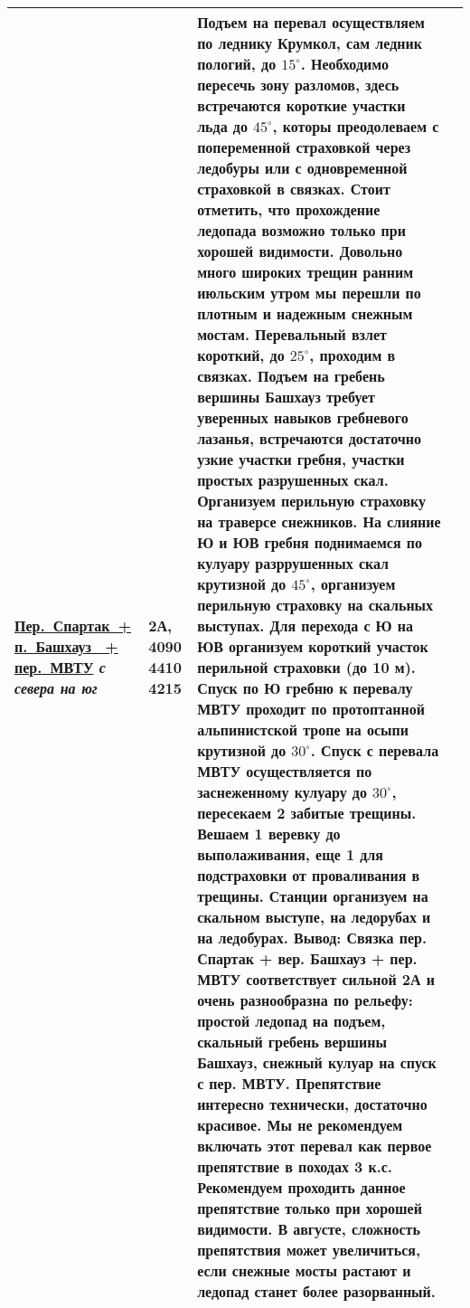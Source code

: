 {\begin{longtable}{|>{\centering\arraybackslash}m{3.8cm}|>{\centering\arraybackslash}m{1.3cm}|>{\raggedright\arraybackslash}m{11.5cm}|>{\centering\arraybackslash}m{1cm}|}
			\hyperref[subsec:Day6]{Пер.~Спартак~+ п.~Башхауз~ + пер.~МВТУ}										\newline\textit{с севера на юг}			&	2А, 4090 4410 4215			&	Подъем на перевал осуществляем по леднику Крумкол, сам ледник пологий, до $15^\circ$. Необходимо пересечь зону разломов, здесь встречаются короткие участки льда до $45^\circ$, которы преодолеваем с попеременной страховкой через ледобуры или с одновременной страховкой в связках. Стоит отметить, что прохождение ледопада возможно только при хорошей видимости. Довольно много широких трещин ранним июльским утром мы перешли по плотным и надежным снежным мостам. Перевальный взлет короткий, до $25^\circ$, проходим в связках. Подъем на гребень вершины Башхауз требует уверенных навыков гребневого лазанья, встречаются достаточно узкие участки гребня, участки простых разрушенных скал. Организуем перильную страховку на траверсе снежников. На слияние Ю и ЮВ гребня поднимаемся по кулуару разррушенных скал крутизной до $45^\circ$, организуем перильную страховку на скальных выступах. Для перехода с Ю на ЮВ организуем короткий участок перильной страховки (до 10 м). Спуск по Ю гребню к перевалу МВТУ проходит по протоптанной альпинистской тропе на осыпи крутизной до $30^\circ$. Спуск с перевала МВТУ осуществляется по заснеженному кулуару до $30^\circ$, пересекаем 2 забитые трещины. Вешаем 1 веревку до выполаживания, еще 1 для подстраховки от проваливания в трещины. Станции организуем на скальном выступе, на ледорубах и на ледобурах. \newline \textbf{Вывод:} Связка пер. Спартак + вер. Башхауз + пер. МВТУ соответствует сильной 2А и очень разнообразна по рельефу: простой ледопад на подъем, скальный гребень вершины Башхауз, снежный кулуар на спуск с пер. МВТУ. Препятствие интересно технически, достаточно красивое. Мы не рекомендуем включать этот перевал как первое препятствие в походах 3 к.с. Рекомендуем проходить данное препятствие только при хорошей видимости. В августе, сложность препятствия может увеличиться, если снежные мосты растают и ледопад станет более разорванный.																											&			\\ \hline

\end{longtable}}
